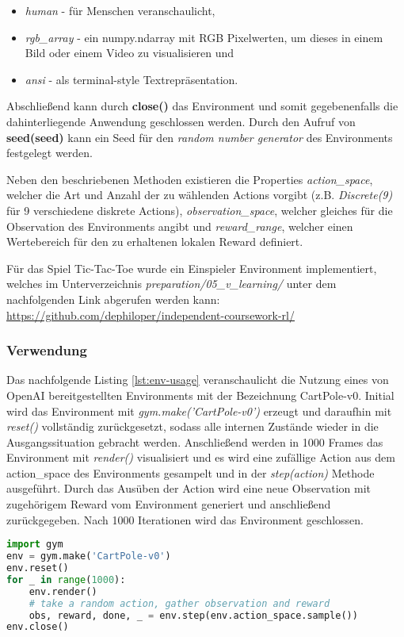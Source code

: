 \documentclass[11pt]{scrartcl}
\begin{document}
\begin{itemize}
\itemsep0pt
\item \textit{human} - für Menschen veranschaulicht, 
\item \textit{rgb\_array} - ein numpy.ndarray mit RGB Pixelwerten, um dieses in einem Bild oder einem 
Video zu visualisieren und 
\item \textit{ansi} - als terminal-style Textrepräsentation.
\end{itemize}
\noindent
Abschließend kann durch \textbf{close()} das Environment und somit gegebenenfalls die 
dahinterliegende Anwendung geschlossen werden. Durch den Aufruf von 
\textbf{seed(seed)} kann ein Seed für den \textit{random number generator}
des Environments festgelegt werden.


Neben den beschriebenen Methoden existieren die Properties \textit{action\_space}, welcher die
Art und Anzahl der zu wählenden Actions vorgibt (z.B. \textit{Discrete(9)} für 9 verschiedene
diskrete Actions), \textit{observation\_space}, welcher gleiches für die Observation des
Environments angibt und \textit{reward\_range}, welcher einen Wertebereich für den zu erhaltenen
lokalen Reward definiert.

Für das Spiel Tic-Tac-Toe wurde ein Einspieler Environment implementiert, welches im
Unterverzeichnis \textit{preparation/05\_v\_learning/} unter dem nachfolgenden Link abgerufen
werden kann: \url{https://github.com/dephiloper/independent-coursework-rl/}


\subsubsection{Verwendung}
Das nachfolgende Listing \autoref{lst:env-usage} veranschaulicht die Nutzung eines von OpenAI
bereitgestellten Environments mit der Bezeichnung CartPole-v0. Initial wird das Environment
mit \textit{gym.make('CartPole-v0')} erzeugt und daraufhin mit \textit{reset()} vollständig
zurückgesetzt, sodass alle internen Zustände wieder in die Ausgangssituation gebracht werden. 
Anschließend werden in 1000 Frames das Environment mit \textit{render()} visualisiert und es
wird eine zufällige Action aus dem action\_space des Environments gesampelt und in der
\textit{step(action)} Methode ausgeführt. Durch das Ausüben der Action wird eine neue
Observation mit zugehörigem Reward vom Environment generiert und anschließend zurückgegeben.
Nach 1000 Iterationen wird das Environment geschlossen. 
\begin{lstlisting}[language=Python, caption=environment usage, label=lst:env-usage]
import gym
env = gym.make('CartPole-v0')
env.reset()
for _ in range(1000):
    env.render()
    # take a random action, gather observation and reward
    obs, reward, done, _ = env.step(env.action_space.sample())
env.close()
\end{lstlisting}
\end{document}
